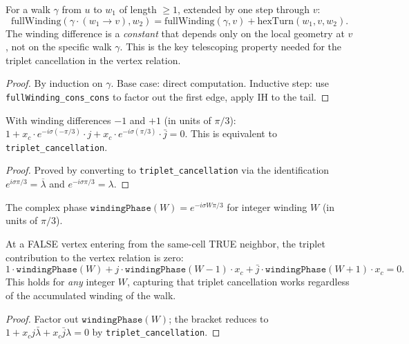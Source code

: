 \begin{lemma}
\begin{lemma}\label{lem:triplet_winding}
\leanok
{}
  For a walk $\gamma$ from $u$ to $w_1$ of length $\geq 1$, extended by one step through $v$:
  \[
    \mathrm{fullWinding}(\gamma \cdot (w_1 \to v), w_2) = \mathrm{fullWinding}(\gamma, v) + \mathrm{hexTurn}(w_1, v, w_2).
  \]
  The winding difference is a \emph{constant} that depends only on the local
  geometry at $v$, not on the specific walk $\gamma$. This is the key
  telescoping property needed for the triplet cancellation in the vertex relation.
\end{lemma}
\begin{proof}\leanok
  By induction on $\gamma$. Base case: direct computation. Inductive step: use
  \texttt{fullWinding\_cons\_cons} to factor out the first edge, apply IH to the tail.
\end{proof}

\begin{lemma}\label{lem:triplet_cancel_geom}
\leanok
{}
  With winding differences $-1$ and $+1$ (in units of $\pi/3$):
  $1 + x_c \cdot e^{-i\sigma(-\pi/3)} \cdot j + x_c \cdot e^{-i\sigma(\pi/3)} \cdot \bar{j} = 0$.
  This is equivalent to \texttt{triplet\_cancellation}.
\end{lemma}
\begin{proof}
\leanok
  Proved by converting to \texttt{triplet\_cancellation} via the
  identification $e^{i\sigma\pi/3} = \overline{\lambda}$ and
  $e^{-i\sigma\pi/3} = \lambda$.
\end{proof}

\begin{definition}\label{def:winding_phase}
\leanok
{}
  The complex phase $\texttt{windingPhase}(W) = e^{-i\sigma W\pi/3}$
  for integer winding $W$ (in units of $\pi/3$).
\end{definition}

\begin{lemma}\label{lem:false_vertex_triplet}
\leanok
{}
  At a FALSE vertex entering from the same-cell TRUE neighbor,
  the triplet contribution to the vertex relation is zero:
  \[
    1 \cdot \texttt{windingPhase}(W)
    + j \cdot \texttt{windingPhase}(W{-}1) \cdot x_c
    + \bar{j} \cdot \texttt{windingPhase}(W{+}1) \cdot x_c = 0.
  \]
  This holds for \emph{any} integer $W$, capturing that triplet
  cancellation works regardless of the accumulated winding of the walk.
\end{lemma}
\begin{proof}
\leanok
  Factor out $\texttt{windingPhase}(W)$; the bracket reduces to
  $1 + x_c j \bar{\lambda} + x_c \bar{j} \lambda = 0$
  by \texttt{triplet\_cancellation}.
\end{proof}


\end{lemma}
